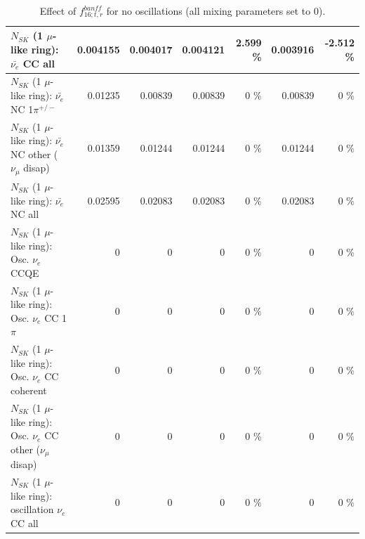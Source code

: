 \begin{table}
\begin{tabular}{| l | r | r | r  r | r  r |}
                            $N_{SK}$ (1 $\mu$-like ring): $\bar{\nu_{e}}$ CC all &        0.004155 &        0.004017 &        0.004121 &    2.599 \%  &        0.003916 &   -2.512 \%  \\ 
\hline
                     $N_{SK}$ (1 $\mu$-like ring): $\bar{\nu_e}$ NC 1$\pi^{+/-}$ &         0.01235 &         0.00839 &         0.00839 &        0 \%  &         0.00839 &        0 \%  \\ 
          $N_{SK}$ (1 $\mu$-like ring): $\bar{\nu_e}$ NC other ($\nu_\mu$ disap) &         0.01359 &         0.01244 &         0.01244 &        0 \%  &         0.01244 &        0 \%  \\ 
                            $N_{SK}$ (1 $\mu$-like ring): $\bar{\nu_{e}}$ NC all &         0.02595 &         0.02083 &         0.02083 &        0 \%  &         0.02083 &        0 \%  \\ 
\hline
\hline
\hline
                                 $N_{SK}$ (1 $\mu$-like ring): Osc. $\nu_e$ CCQE &               0 &               0 &               0 &        0 \%  &               0 &        0 \%  \\ 
                            $N_{SK}$ (1 $\mu$-like ring): Osc. $\nu_e$ CC 1$\pi$ &               0 &               0 &               0 &        0 \%  &               0 &        0 \%  \\ 
                          $N_{SK}$ (1 $\mu$-like ring): Osc. $\nu_e$ CC coherent &               0 &               0 &               0 &        0 \%  &               0 &        0 \%  \\ 
           $N_{SK}$ (1 $\mu$-like ring): Osc. $\nu_e$ CC other ($\nu_\mu$ disap) &               0 &               0 &               0 &        0 \%  &               0 &        0 \%  \\ 
                        $N_{SK}$ (1 $\mu$-like ring): oscillation $\nu_e$ CC all &               0 &               0 &               0 &        0 \%  &               0 &        0 \%  \\ 
\hline
\hline
\end{tabular}
\caption{ Effect of $f_{16; t, r}^{banff}$ for no oscillations (all mixing parameters set to 0). }
\label{tab:num_banff_maqe_1RmuT_3f_osc_t13:0}
\end{table}
\clearpage
